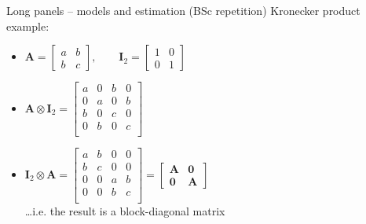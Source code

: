 \documentclass[usenames,dvipsnames]{beamer}
\begin{document}
\begin{frame}{Long panels -- models and estimation (BSc repetition)}
\footnotesize
Kronecker product example:\\ \bigskip
\begin{itemize}
    \item $\bm{A} = \begin{bmatrix} 
    a & b \\ b & c
    \end{bmatrix},\qquad \bm{I}_2 = \begin{bmatrix} 
    1 & 0 \\ 0 & 1
    \end{bmatrix}$
    \bigskip
    \item $\bm{A} \otimes \bm{I}_2 = 
    \begin{bmatrix} 
a & 0 & b & 0 \\ 
0 & a & 0 & b \\ 
b & 0 & c & 0 \\ 
0 & b & 0 & c \\ 
\end{bmatrix}$
    \bigskip
    \item $\bm{I}_2 \otimes \bm{A} = 
    \begin{bmatrix} 
a & b & 0 & 0 \\ 
b & c & 0 & 0 \\ 
0 & 0 & a & b \\ 
0 & 0 & b & c \\ 
\end{bmatrix} = 
\begin{bmatrix}
\bm{A} & \bm{0} \\ \bm{0} & \bm{A}
\end{bmatrix}$\\ \smallskip \dots i.e. the result is a block-diagonal matrix

\end{itemize}
\end{frame}
\end{document}
